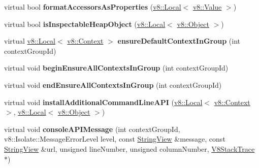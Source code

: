 \begin{DoxyCompactItemize}
\item 
\mbox{\label{classv8__inspector_1_1V8InspectorClient_ae9d50c9ea6716879281ca401fbe8114a}} 
virtual bool {\bfseries format\+Accessors\+As\+Properties} (\mbox{\hyperlink{classv8_1_1Local}{v8\+::\+Local}}$<$ \mbox{\hyperlink{classv8_1_1Value}{v8\+::\+Value}} $>$)
\item 
\mbox{\label{classv8__inspector_1_1V8InspectorClient_a0871bb7e065494f174e445845b56f30c}} 
virtual bool {\bfseries is\+Inspectable\+Heap\+Object} (\mbox{\hyperlink{classv8_1_1Local}{v8\+::\+Local}}$<$ \mbox{\hyperlink{classv8_1_1Object}{v8\+::\+Object}} $>$)
\item 
\mbox{\label{classv8__inspector_1_1V8InspectorClient_a8b47c57ccc57f386570e1148a2efe38a}} 
virtual \mbox{\hyperlink{classv8_1_1Local}{v8\+::\+Local}}$<$ \mbox{\hyperlink{classv8_1_1Context}{v8\+::\+Context}} $>$ {\bfseries ensure\+Default\+Context\+In\+Group} (int context\+Group\+Id)
\item 
\mbox{\label{classv8__inspector_1_1V8InspectorClient_a004987bc7b929f12a39d3e1cc7804a05}} 
virtual void {\bfseries begin\+Ensure\+All\+Contexts\+In\+Group} (int context\+Group\+Id)
\item 
\mbox{\label{classv8__inspector_1_1V8InspectorClient_affc437fd3eb8e2294b1e9d6ad8bf8dad}} 
virtual void {\bfseries end\+Ensure\+All\+Contexts\+In\+Group} (int context\+Group\+Id)
\item 
\mbox{\label{classv8__inspector_1_1V8InspectorClient_acbc688fd17d8c8a29435c4533f9e1f43}} 
virtual void {\bfseries install\+Additional\+Command\+Line\+A\+PI} (\mbox{\hyperlink{classv8_1_1Local}{v8\+::\+Local}}$<$ \mbox{\hyperlink{classv8_1_1Context}{v8\+::\+Context}} $>$, \mbox{\hyperlink{classv8_1_1Local}{v8\+::\+Local}}$<$ \mbox{\hyperlink{classv8_1_1Object}{v8\+::\+Object}} $>$)
\item 
\mbox{\label{classv8__inspector_1_1V8InspectorClient_acac454b61131fecf04f5d7631ddeae86}} 
virtual void {\bfseries console\+A\+P\+I\+Message} (int context\+Group\+Id, v8\+::\+Isolate\+::\+Message\+Error\+Level level, const \mbox{\hyperlink{classv8__inspector_1_1StringView}{String\+View}} \&message, const \mbox{\hyperlink{classv8__inspector_1_1StringView}{String\+View}} \&url, unsigned line\+Number, unsigned column\+Number, \mbox{\hyperlink{classv8__inspector_1_1V8StackTrace}{V8\+Stack\+Trace}} $\ast$)

\end{DoxyCompactItemize}
